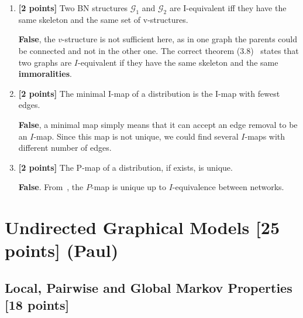 \documentclass[12pt]{article}
\newcommand{\Gcal}{\mathcal{G}}
\begin{document}
\begin{enumerate}
\item \textbf{[2 points]} Two BN structures $ \Gcal_1 $ and $ \Gcal_2 $ are I-equivalent iff they have the same skeleton and the same set of v-structures.

\begin{solution}
  \textbf{False}, the $v$-structure is not sufficient here, as in one graph
  the parents could be connected and not in the other one. The correct
  theorem (3.8)~\cite{koller2009probabilistic} states that two graphs are
  $I$-equivalent if they have the same skeleton and the same
  \textbf{immoralities}.
\end{solution}

\item \textbf{[2 points]} The minimal I-map of a distribution is the I-map with fewest edges.

\begin{solution}
  \textbf{False}, a minimal map simply means that it can accept an edge
  removal to be an $I$-map. Since this map is not unique, we could find
  several $I$-maps with different number of edges. 
\end{solution}
\item \textbf{[2 points]} The P-map of a distribution, if exists, is unique. 
\begin{solution}
  \textbf{False}. From~\cite[page 84]{koller2009probabilistic}, the $P$-map
  is unique up to $I$-equivalence between networks.
\end{solution}
\end{enumerate}


\newpage


\section{Undirected Graphical Models [25 points] (Paul)}

\subsection{Local, Pairwise and Global Markov Properties [18 points]}
\end{document}
